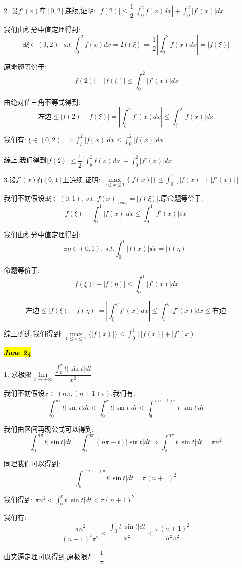 2. 设$f'(x)$在$[0,2]$连续,证明: $|f(2)|\leq \dfrac{1}{2}|\int_{0}^{2}f(x)dx|+\int_{0}^{2}|f'(x)|dx$
\begin{solution}
	
	我们由积分中值定理得到: 
	$$\exists\xi\in(0,2),\ s.t. \int_{0}^{2}f(x)dx=2f(\xi)\Rightarrow \dfrac{1}{2}|\int_{0}^{2}f(x)dx|=|f(\xi)|$$
	
	原命题等价于: 
	$$|f(2)|-|f(\xi)|\leq \int_{0}^{2}|f'(x)|dx$$
	
	由绝对值三角不等式得到: 
	$$\text{左边}\leq |f(2)-f(\xi)|=|\int_{\xi}^{2}f'(x)dx|\leq \int_{\xi}^{2}|f(x)|dx$$
	
	我们有: $\xi\in(0,2),\Rightarrow \int_{\xi}^{2}|f(x)|dx\leq \int_{0}^{2}|f(x)|dx$
	
	综上,我们得到$|f(2)|\leq \dfrac{1}{2}|\int_{0}^{2}f(x)dx|+\int_{0}^{2}|f'(x)|dx$
\end{solution}


3.设$f'(x)$在$[0,1]$上连续,证明: $\mathop{max}\limits_{0\leq x\leq 1}\{|f(x)|\}\leq \int_{0}^{1}[|f(x)|+|f'(x)|]$
\begin{solution}
	
	我们不妨假设$\exists \xi\in(0,1),\ s.t. |f(x)|_{max}=|f(\xi)|$,原命题等价于: 
	$$f(\xi)-\int_{0}^{1}|f(x)|dx\leq \int_{0}^{1}|f'(x)|dx$$
	
	我们由积分中值定理得到: 
	$$\exists\eta\in(0,1),\ s.t. \int_{0}^{1}|f(x)|dx=|f(\eta)|$$
	
	命题等价于: 
	$$|f(\xi)|-|f(\eta)|\leq \int_{0}^{1}|f'(x)|dx$$
	
	$$\text{左边}\leq |f(\xi)-f(\eta)|=|\int_{\xi}^{\eta}f'(x)dx|\leq \int_{\xi}^{\eta}|f'(x)|dx\leq\text{右边}$$
	
	综上所述,我们得到: $\mathop{max}\limits_{0\leq x\leq 1}\{|f(x)|\}\leq \int_{0}^{1}[|f(x)|+|f'(x)|]$
\end{solution}


\hl{\textbf{\textit{June 24}}}

1. 求极限$\lim\limits_{x\rightarrow+\infty}\dfrac{\int_{0}^{x}t|\sin t|dt}{x^2}$
\begin{solution}
	
	我们不妨假设$x\in(n\pi,(n+1)\pi)$,我们有: 
	$$\int_{0}^{n\pi}t|\sin t|dt< \int_{0}^{x}t|\sin t|dt<\int_{0}^{(n+1)\pi}t|\sin t|dt$$
	
	我们由区间再现公式可以得到: 
	$$\int_{0}^{n\pi}t|\sin t|dt=\int_{0}^{n\pi}(n\pi-t)|\sin t|dt\Rightarrow \int_{0}^{n\pi}t|\sin t|dt=\pi n^2$$
	
	同理我们可以得到: 
	$$\int_{0}^{(n+1)\pi}t|\sin t|dt=\pi (n+1)^2$$
	
	我们得到: $\pi n^2< \int_{0}^{x}t|\sin t|dt<\pi (n+1)^2$
	
	我们有: 
	$$\dfrac{\pi n^2}{(n+1)^2\pi^2}<\dfrac{\int_{0}^{x}t|\sin t|dt}{x^2}<\dfrac{\pi (n+1)^2}{n^2\pi^2}$$
	
	由夹逼定理可以得到,原极限$I=\dfrac{1}{\pi}$
\end{solution}

